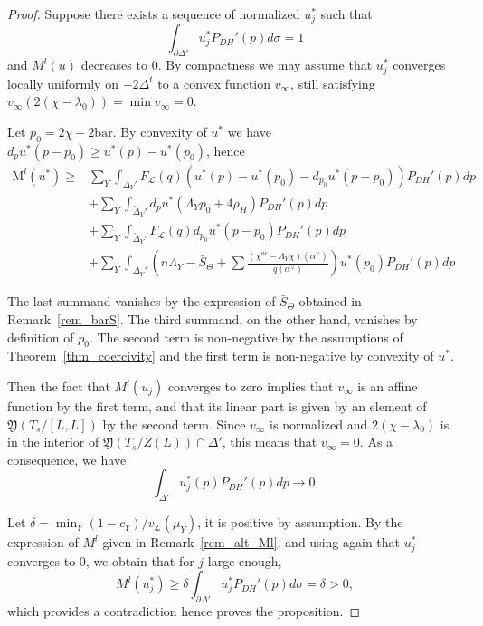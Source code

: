 \documentclass{amsart}
\theoremstyle{definition}
\begin{document}
\begin{proof}
Suppose there exists a sequence of normalized $u_j^*$ such that 
\[
\int_{\partial \Delta'} u_j^*P_{DH}'(p)d\sigma =1
\] 
and $M^l(u)$ decreases to $0$.
By compactness 
we may assume that $u^*_j$ converges locally uniformly on 
$-2\Delta^t$ to a convex 
function $v_{\infty}$, still satisfying 
$v_{\infty}(2(\chi-\lambda_0))=\min v_{\infty} =0$.

Let $p_0=2\chi-2\mathrm{bar}$. 
By convexity of $u^*$ we have 
$d_pu^*(p-p_0)\geq u^*(p)-u^*(p_0)$, 
hence 
\begin{align*}
\mathrm{M}^l(u^*) \geq  & 
\sum_Y \int_{\tilde{\Delta}_Y'} 
F_{\mathcal{L}}(q)
(u^*(p)-u^*(p_0)-d_{p_0}u^*(p-p_0))P_{DH}'(p)dp \\
& +
\sum_Y \int_{\tilde{\Delta}_Y'} d_pu^*(\Lambda_Yp_0+4\rho_H)P_{DH}'(p)dp
\\ & 
+
\sum_Y \int_{\tilde{\Delta}_Y'} 
F_{\mathcal{L}}(q)
d_{p_0}u^*(p-p_0)P_{DH}'(p)dp
\\
& +
\sum_Y \int_{\tilde{\Delta}_Y'} 
\left( n\Lambda_Y-\bar{S}_{\Theta}
+\sum\frac{(\chi^{ac}-\Lambda_Y\chi)(\alpha^{\vee})}{q(\alpha^{\vee})} \right)
u^*(p_0)P_{DH}'(p)dp
\end{align*}

The last summand vanishes by the expression of $\bar{S}_{\Theta}$ 
obtained in Remark~\ref{rem_barS}. 
The third summand, on the other hand, vanishes by definition of $p_0$.
The second term is non-negative by the assumptions of Theorem~\ref{thm_coercivity}  
and the first term is non-negative by convexity of $u^*$.

Then the fact that $M^l(u_j)$ converges to zero implies that 
$v_{\infty}$ is an affine function by the first term, and 
that its linear part is given by an element of 
$\mathfrak{Y}(T_s/[L,L])$ by the second term. 
Since $v_{\infty}$ is normalized and $2(\chi-\lambda_0)$ is in the interior 
of $\mathfrak{Y}(T_s/Z(L))\cap \Delta'$, 
this means that $v_{\infty}=0$.
As a consequence, we have 
\[
\int_{\Delta'}u_j^*(p)P_{DH}'(p)dp\rightarrow 0.
\]

Let $\delta=\min_Y (1-c_Y)/v_{\mathcal{L}}(\mu_Y)$, it is 
positive by assumption. 
By the expression of $M^l$ given in Remark~\ref{rem_alt_Ml}, 
and using again that $u^*_j$ converges to $0$, we obtain 
that for $j$ large enough, 
\[
M^l(u_j^*)\geq \delta \int_{\partial \Delta'}u^*_jP_{DH}'(p)d\sigma=\delta>0,
\]
which provides a contradiction hence proves the proposition. 
\end{proof}
\end{document}
